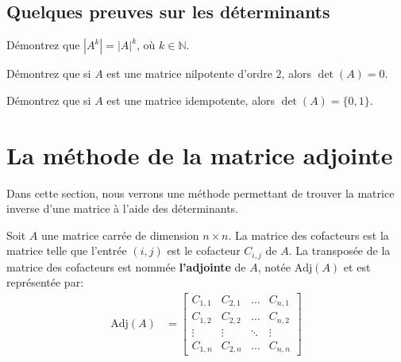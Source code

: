 \documentclass[]{book}
\theoremstyle{definition}
\theoremstyle{definition}
\theoremstyle{definition}
\theoremstyle{remark}
\let\BeginKnitrBlock\begin \let\EndKnitrBlock\end
\begin{document}
\hypertarget{quelques-preuves-sur-les-determinants}{%
\subsection{Quelques preuves sur les déterminants}\label{quelques-preuves-sur-les-determinants}}

\BeginKnitrBlock{example}
\protect\hypertarget{exm:unnamed-chunk-105}{}{\label{exm:unnamed-chunk-105} }Démontrez que \(|A^k| = |A|^k\), où \(k\in\mathbb{N}\).
\EndKnitrBlock{example}

\BeginKnitrBlock{example}
\protect\hypertarget{exm:unnamed-chunk-106}{}{\label{exm:unnamed-chunk-106} }Démontrez que si \(A\) est une matrice nilpotente d'ordre \(2\), alors \(\det(A)=0\).
\EndKnitrBlock{example}

\BeginKnitrBlock{example}
\protect\hypertarget{exm:unnamed-chunk-107}{}{\label{exm:unnamed-chunk-107} }Démontrez que si \(A\) est une matrice idempotente, alors \(\det(A)=\{0,1\}\).
\EndKnitrBlock{example}

\hypertarget{la-methode-de-la-matrice-adjointe}{%
\section{La méthode de la matrice adjointe}\label{la-methode-de-la-matrice-adjointe}}

Dans cette section, nous verrons une méthode permettant de trouver la matrice inverse d'une matrice à l'aide des déterminants.

\BeginKnitrBlock{definition}[L'adjointe de la matrice $A$]
\protect\hypertarget{def:unnamed-chunk-108}{}{\label{def:unnamed-chunk-108} {} }Soit \(A\) une matrice carrée de dimension \(n \times n\). La matrice des cofacteurs est la matrice telle que l'entrée \((i,j)\) est le cofacteur \(C_{i,j}\) de \(A\). La transposée de la matrice des cofacteurs est nommée \textbf{l'adjointe} de \(A\), notée \(\text{Adj}(A)\) et est représentée par:
\begin{align*}
\text{Adj}(A) &= \begin{bmatrix}
C_{1,1} & C_{2,1} & \ldots & C_{n,1} \\
C_{1,2} & C_{2,2} & \ldots & C_{n,2} \\
\vdots & \vdots & \ddots & \vdots \\
C_{1,n} & C_{2,n} & \ldots & C_{n,n}
\end{bmatrix}
\end{align*}
\EndKnitrBlock{definition}
\end{document}
